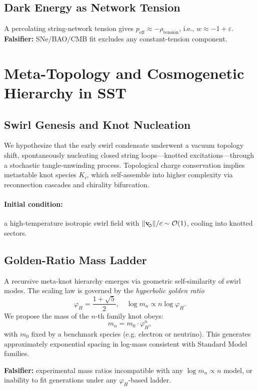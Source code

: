 \documentclass[10pt,reprint,aps,onecolumn,nofootinbib]{revtex4-2}
\newcommand{\vswirl}{\mathbf{v}_{\!\mkern-2mu\scriptscriptstyle\boldsymbol{\circlearrowleft}}}
\begin{document}
        \subsection{Dark Energy as Network Tension}
            A percolating string-network tension gives $p_{\text{eff}}\approx -\rho_{\text{tension}}$, i.e., $w\approx -1+\varepsilon$. \textbf{Falsifier:} SNe/BAO/CMB fit excludes any constant-tension component.

    \section{Meta-Topology and Cosmogenetic Hierarchy in SST}
    \label{sec:SST-metacosmo}

        \subsection{Swirl Genesis and Knot Nucleation}
            We hypothesize that the early swirl condensate underwent a vacuum topology shift, spontaneously nucleating closed string loops—knotted excitations—through a stochastic tangle-unwinding process. Topological charge conservation implies metastable knot species \(K_i\), which self-assemble into higher complexity via reconnection cascades and chirality bifurcation.

            \paragraph{Initial condition:} a high-temperature isotropic swirl field with $\lVert\vswirl\rVert/c \sim \mathcal{O}(1)$, cooling into knotted sectors.

        \subsection{Golden-Ratio Mass Ladder}
        A recursive meta-knot hierarchy emerges via geometric self-similarity of swirl modes. The scaling law is governed by the \emph{hyperbolic golden ratio}
        \[
            \varphi_H = \frac{1 + \sqrt{5}}{2},\quad \log m_n \propto n \log \varphi_H.
        \]
        We propose the mass of the $n$-th family knot obeys:
        \[
            m_n = m_0 \cdot \varphi_H^n,
        \]
        with $m_0$ fixed by a benchmark species (e.g. electron or neutrino). This generates approximately exponential spacing in log-mass consistent with Standard Model families.

        \textbf{Falsifier:} experimental mass ratios incompatible with any $\log m_n \propto n$ model, or inability to fit generations under any $\varphi_H$-based ladder.
\end{document}
